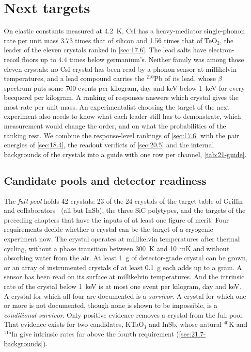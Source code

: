 \section{Next targets}\label{sec:21.7}

On elastic constants measured at \SI{4.2}{K}, CsI has a heavy-mediator single-phonon rate per unit mass 3.73 times that of silicon and 1.56 times that of TeO$_2$, the leader of the eleven crystals ranked in \cref{sec:17.6}. The lead salts have electron-recoil floors up to 4.4 times below germanium's. Neither family was among those eleven crystals: no CsI crystal has been read by a phonon sensor at millikelvin temperatures, and a lead compound carries the $^{210}$Pb of its lead, whose $\beta$ spectrum puts some 700 events per kilogram, day and keV below \SI{1}{keV} for every becquerel per kilogram. A ranking of responses answers which crystal gives the most rate per unit mass. An experimentalist choosing the target of the next experiment also needs to know what each leader still has to demonstrate, which measurement would change the order, and on what the probabilities of the ranking rest. We combine the response-level rankings of \cref{sec:17.6} with the pair energies of \cref{sec:18.4}, the readout verdicts of \cref{sec:20.5} and the internal backgrounds of the crystals into a guide with one row per channel, \cref{tab:21-guide}.

\subsection{Candidate pools and detector readiness}\label{sec:21.7-pools}

The \emph{full pool} holds 42 crystals: 23 of the 24 crystals of the target table of Griffin and collaborators~\cite[Table~I]{griffin2020multichannel} (all but InSb), the three SiC polytypes, and the targets of the preceding chapters that have the inputs of at least one figure of merit. Four requirements decide whether a crystal can be the target of a cryogenic experiment now. The crystal operates at millikelvin temperatures after thermal cycling, without a phase transition between \SI{300}{K} and \SI{10}{mK} and without absorbing water from the air. At least \SI{1}{g} of detector-grade crystal can be grown, or an array of instrumented crystals of at least \SI{0.1}{g} each adds up to a gram. A sensor has been read on its surface at millikelvin temperatures. And the intrinsic rate of the crystal below \SI{1}{keV} is at most one event per kilogram, day and keV. A crystal for which all four are documented is a \emph{survivor}. A crystal for which one or more is not documented, though none is shown to be impossible, is a \emph{conditional survivor}. Only positive evidence removes a crystal from the full pool. That evidence exists for two candidates, KTaO$_3$ and InSb, whose natural $^{40}$K and $^{115}$In give intrinsic rates far above the fourth requirement (\cref{sec:21.7-backgrounds}).

